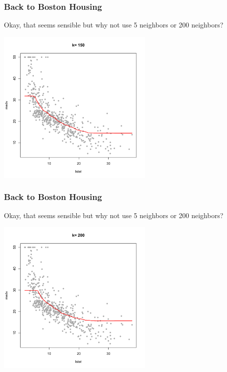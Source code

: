 \documentclass[flegn]{beamer}
\begin{document}
\begin{frame}
\frametitle{Back to Boston Housing}
{\color{blue}Okay, that seems sensible but why not use 5 neighbors or 200 neighbors? }

\vspace{-0.5cm}
\begin{center}
\includegraphics[width=3in]{k150}
\end{center}
\end{frame}

\begin{frame}
\frametitle{Back to Boston Housing}
{\color{blue}Okay, that seems sensible but why not use 5 neighbors or 200 neighbors? }

\vspace{-0.5cm}
\begin{center}
\includegraphics[width=3in]{k200}
\end{center}
\end{frame}
\end{document}
